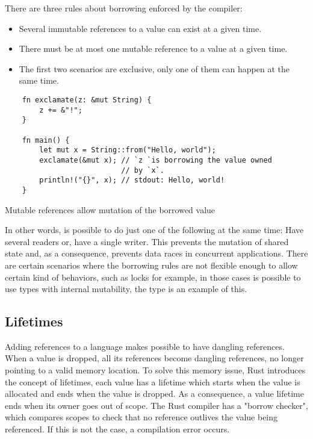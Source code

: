 There are three rules about borrowing enforced by the compiler:
\begin{itemize}
    \item Several immutable references to a value can exist at a given time.
    \item There must be at most one mutable reference to a value at a given time.
    \item The first two scenarios are exclusive, only one of them can happen at the same time.
\end{itemize}

\begin{listing}[h]
	\begin{verbatim}
    fn exclamate(z: &mut String) {
        z += &"!";    
    }

    fn main() {
        let mut x = String::from("Hello, world");
        exclamate(&mut x); // `z `is borrowing the value owned 
                           // by `x`.
        println!("{}", x); // stdout: Hello, world!
    }
	\end{verbatim}
  \caption{Mutable references allow mutation of the borrowed value}
  \label{lst:mutable_ref}
\end{listing}

In other words, is possible to do just one of the following at the same time:
Have several readers or, have a single writer. This prevents the mutation of
shared state and, as a consequence, prevents data races in concurrent
applications. There are certain scenarios where the borrowing rules are not
flexible enough to allow certain kind of behaviors, such as locks for example,
in those cases is possible to use types with internal mutability, the
 type is an example of this.

\subsection{Lifetimes}

Adding references to a language makes possible to have dangling references. When
a value is dropped, all its references become dangling references, no longer
pointing to a valid memory location. To solve this memory issue, Rust introduces
the concept of lifetimes, each value has a lifetime which starts when the value
is allocated and ends when the value is dropped. As a consequence, a value
lifetime ends when its owner goes out of scope. The Rust compiler has a "borrow
checker", which compares scopes to check that no reference outlives the value
being referenced. If this is not the case, a compilation error occurs.

